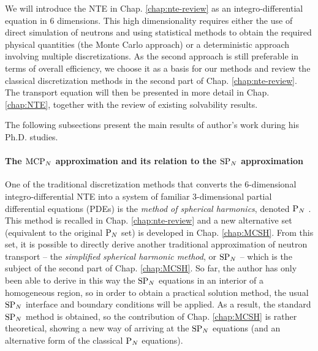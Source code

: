 We will introduce the NTE in Chap. \ref{chap:nte-review} as an integro-differential equation in 6 dimensions. This high
dimensionality requires either the use of direct simulation of neutrons and using statistical methods to obtain the
required physical quantities (the Monte Carlo approach) or a deterministic approach involving multiple discretizations.
As the second approach is still preferable in terms of overall efficiency, we choose it as a basis for our methods and
review the classical discretization methods in the second part of Chap. \ref{chap:nte-review}. The transport equation will
then be presented in more detail in Chap. \ref{chap:NTE}, together with the review of existing solvability results. 

The following subsections present the main results of author's work during his Ph.D. studies.

\paragraph{The $\text{MCP}_{N}$ approximation and its relation to the $\text{SP}_{N}$ approximation} 
One of the traditional discretization methods that converts the 6-dimensional integro-differential NTE into a system of
familiar 3-dimensional partial differential equations (PDEs) is the
\textit{method of spherical harmonics}, denoted $\text{P}_{N}$ 
. This method is recalled in Chap.
\ref{chap:nte-review} and a new alternative set (equivalent to the original $\text{P}_{N}$ set) is developed in Chap.
\ref{chap:MCSH}. From this set, it is possible to directly derive another traditional approximation of neutron transport
-- the \textit{simplified spherical harmonic method}, or $\text{SP}_{N}$  -- which is the subject of the second part of Chap. \ref{chap:MCSH}. So far, the author has only
been able to derive in this way the $\text{SP}_{N}$ equations in an interior of a homogeneous region, so in order to obtain a
practical solution method, the usual $\text{SP}_{N}$ interface and boundary conditions will be applied. As a result, the standard
$\text{SP}_{N}$ method is obtained, so the contribution of Chap. \ref{chap:MCSH} is rather theoretical, showing a new way of
arriving at the $\text{SP}_{N}$ equations (and an alternative form of the classical $\text{P}_{N}$ equations).

